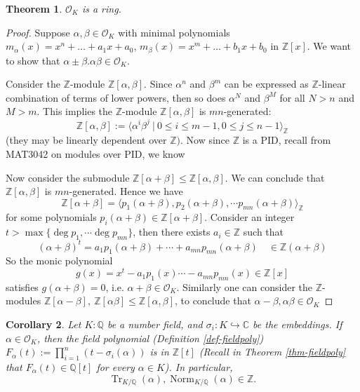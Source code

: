\documentclass[11pt]{book}
\newtheorem{theorem}{Theorem}[section]
\newtheorem{corollary}[theorem]{Corollary}
\begin{document}
\begin{theorem} \label{thm-okring}
    $\mathcal{O}_K$ is a ring.
\end{theorem}
\begin{proof}
    Suppose $\alpha,\beta \in \mathcal{O}_K$ with minimal polynomials $m_{\alpha}(x) = x^n + \dots + a_1x + a_0$, $m_{\beta}(x) = x^m + \dots + b_1x + b_0$ in $\mathbb{Z}[x]$. We want to show that $\alpha \pm \beta. \alpha\beta\in \mathcal{O}_K$.
    
    Consider the $\mathbb{Z}$-module $\mathbb{Z}[\alpha, \beta]$. Since $\alpha^n$ and $\beta^m$ can be expressed as $\mathbb{Z}$-linear combination of terms of lower powers, then so does $\alpha^N$ and $\beta^M$ for all $N > n$ and $M > m$. This implies the $\mathbb{Z}$-module $\mathbb{Z}[\alpha, \beta]$ is $mn$-generated:
    $$\mathbb{Z}[\alpha, \beta]:=\langle \alpha^i\beta^j\ |\ 0\leq i\leq m-1, 0\leq j\leq n-1\rangle_\mathbb{Z} $$
    (they may be linearly dependent over $\mathbb{Z})$.
    Now since $\mathbb{Z}$ is a PID, recall from MAT3042 on modules over PID, we know 
    \begin{center}
    \end{center}
    
    Now consider the submodule $\mathbb{Z}[\alpha+\beta] \leq \mathbb{Z}[\alpha,\beta]$. We can conclude that $\mathbb{Z}[\alpha,\beta] $ is $mn$-generated. Hence we have $$\mathbb{Z}[\alpha+\beta]=\langle p_1(\alpha+\beta), p_2(\alpha+\beta),\cdots p_{mn}(\alpha+\beta)\rangle_{\mathbb{Z}}$$
    for some polynomials $p_i(\alpha+\beta) \in \mathbb{Z}[\alpha+\beta]$.
    Consider an integer $t > \max\{\operatorname{deg}p_1,\cdots \operatorname{deg}p_{mn}\}$, 
    then there exists $a_{i} \in \mathbb{Z}$ such that 
    $$(\alpha+\beta)^t= a_1p_1(\alpha+\beta)+\cdots + a_{mn}p_{mn}(\alpha+\beta) \quad \in \mathbb{Z}(\alpha+\beta)$$ 
    So the monic polynomial 
    $$g(x)=x^t-a_1p_1(x) \cdots - a_{mn}p_{mn}(x) \in \mathbb{Z}[x]$$ 
    satisfies $g(\alpha+\beta)=0$, i.e. $\alpha + \beta \in \mathcal{O}_K$.
    Similarly one can consider the $\mathbb{Z}$-modules $\mathbb{Z}[\alpha - \beta],\ \mathbb{Z}[\alpha \beta] \leq\mathbb{Z}[\alpha,\beta]$, to conclude that $\alpha - \beta, \alpha\beta \in \mathcal{O}_K$
\end{proof}
\begin{corollary} \label{cor-trnormz}
    Let $K:\mathbb{Q}$ be a number field, and $\sigma_i:K\hookrightarrow \mathbb{C} $ be the embeddings. If $\alpha\in \mathcal{O}_K$, then the field polynomial (Definition \ref{def-fieldpoly}) $F_{\alpha}(t):=\prod_{i=1}^n (t-\sigma_i(\alpha)) $ is in $\mathbb{Z}[t]$ (Recall in Theorem \ref{thm-fieldpoly} that $F_{\alpha}(t) \in \mathbb{Q}[t]$ for every $\alpha\in K$). In particular, $$\operatorname{Tr}_{K/\mathbb{Q}}(\alpha), \operatorname{Norm}_{K/\mathbb{Q}}(\alpha) \in \mathbb{Z}.$$
\end{corollary}
\end{document}
